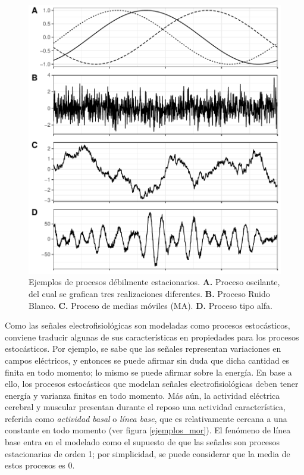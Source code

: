 \documentclass[12pt,letterpaper,draft]{book}
\begin{document}
\begin{figure}
\centering
\includegraphics[width=\linewidth]{./img_mas_ejemplos/ruidos_ejemplos.pdf}
\caption[Ejemplos de procesos débilmente estacionarios]{Ejemplos de procesos débilmente estacionarios. \textbf{A.} Proceso oscilante, del cual se grafican tres realizaciones diferentes. \textbf{B.} Proceso Ruido Blanco. \textbf{C.} Proceso de medias móviles (MA). \textbf{D.} Proceso tipo alfa. }
\end{figure}

Como las señales electrofisiológicas son modeladas como procesos estocásticos, conviene traducir algunas de sus características en propiedades para los procesos estocásticos.
%
Por ejemplo, se sabe que las señales representan variaciones en campos eléctricos, y entonces se puede afirmar sin duda que dicha cantidad es finita en todo momento; lo mismo se puede afirmar sobre la energía.
%
En base a ello, los procesos estocásticos que modelan señales electrofisiológicas deben tener energía y varianza finitas en todo momento.
%
Más aún, la actividad eléctrica cerebral y muscular presentan durante el reposo una actividad característica, referida como \textit{actividad basal} o \textit{línea base}, que es relativamente cercana a una constante en todo momento (ver figura \ref{ejemplos_mor}).
%
El fenómeno de línea base entra en el modelado como el supuesto de que las señales son procesos estacionarias de orden 1; por simplicidad, se puede considerar que la media de estos procesos es 0.
\end{document}
